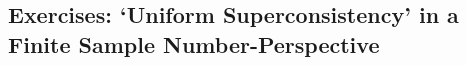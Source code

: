 \documentclass[a4paper]{book}
\begin{document}


\subsection{Exercises: `Uniform Superconsistency' in a Finite Sample Number-Perspective}\label{ex_dfa_1}
\end{document}
